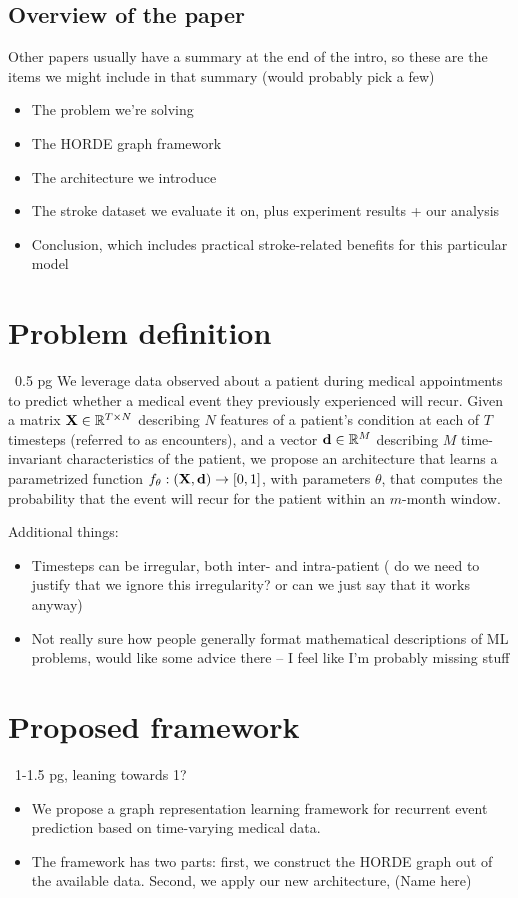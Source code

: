 \documentclass[conference]{IEEEtran}
\begin{document}
\subsection{Overview of the paper}
{\color{red}Other papers usually have a summary at the end of the intro, so these are the items we might include in that summary (would probably pick a few)}
\begin{itemize}
    \item The problem we're solving
    \item The HORDE graph framework
    \item The architecture we introduce
    \item The stroke dataset we evaluate it on, plus experiment results + our analysis
    \item Conclusion, which includes practical stroke-related benefits for this particular model
\end{itemize}

\section{Problem definition}
~0.5 pg
We leverage data observed about a patient during medical appointments to predict whether a medical event they previously experienced will recur. 
Given a matrix $\bold{X} \in \mathbb{R}^{T \times N}$ describing $N$ features of a patient's condition at each of $T$ timesteps (referred to as encounters), 
    and a vector $\bold{d} \in \mathbb{R}^M$ describing $M$ time-invariant characteristics of the patient, 
    we propose an architecture that learns a parametrized function $f_\theta : (\bold{X}, \bold{d}) \rightarrow \left[0, 1\right]$, 
    with parameters $\theta$, that computes the probability that the event will recur for the patient within an $m$-month window. 

Additional things:
\begin{itemize}
    \item Timesteps can be irregular, both inter- and intra-patient ({\color{red} do we need to justify that we ignore this irregularity? or can we just say that it works anyway)}
    \item {\color{red}Not really sure how people generally format mathematical descriptions of ML problems, would like some advice there -- I feel like I'm probably missing stuff}
\end{itemize}

\section{Proposed framework}
~1-1.5 pg, leaning towards 1?
\begin{itemize}
    \item We propose a graph representation learning framework for recurrent event prediction based on time-varying medical data.
    \item The framework has two parts: first, we construct the HORDE graph out of the available data. Second, we apply our new architecture, (Name here)
\end{itemize}
\end{document}
